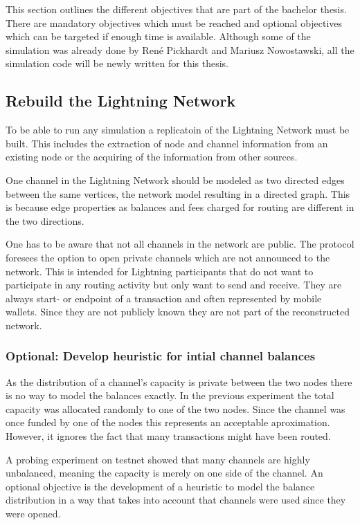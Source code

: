 \documentclass[final]{fhnwreport}       %
\begin{document}
This section outlines the different objectives that are part of the bachelor thesis. There are mandatory objectives which must be reached and optional objectives which can be targeted if enough time is available. Although some of the simulation was already done by René Pickhardt and Mariusz Nowostawski, all the simulation code will be newly written for this thesis.

\subsection{Rebuild the Lightning Network}\label{sec:o_rebuild}

To be able to run any simulation a replicatoin of the Lightning Network must be built. This includes the extraction of node and channel information from an existing node or the acquiring of the information from other sources. 

One channel in the Lightning Network should be modeled as two directed edges between the same vertices, the network model resulting in a directed graph. This is because edge properties as balances and fees charged for routing are different in the two directions. 

One has to be aware that not all channels in the network are public. The protocol foresees the option to open private channels which are not announced to the network. This is intended for Lightning participants that do not want to participate in any routing activity but only want to send and receive. They are always start- or endpoint of a transaction and often represented by mobile wallets. Since they are not publicly known they are not part of the reconstructed network. 

\subsubsection{Optional: Develop heuristic for intial channel balances}

As the distribution of a channel's capacity is private between the two nodes there is no way to model the balances exactly. In the previous experiment the total capacity was allocated randomly to one of the two nodes. Since the channel was once funded by one of the nodes this represents an acceptable aproximation. However, it ignores the fact that many transactions might have been routed. 

A probing experiment on testnet \cite{tikhomirov_probing_2020} showed that many channels are highly unbalanced, meaning the capacity is merely on one side of the channel. An optional objective is the development of a heuristic to model the balance distribution in a way that takes into account that channels were used since they were opened.
\end{document}
